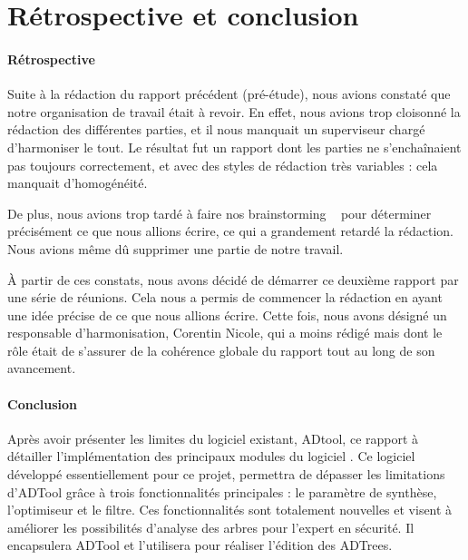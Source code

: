 \section{Rétrospective et conclusion}
	\paragraph{Rétrospective} Suite à la rédaction du rapport précédent (pré-étude), nous avions constaté que notre organisation de travail était à revoir. En effet, nous avions trop cloisonné la rédaction des différentes parties, et il nous manquait un superviseur chargé d'harmoniser le tout. Le résultat fut un rapport dont les parties ne s'enchaînaient pas toujours correctement, et avec des styles de rédaction très variables : cela manquait d'homogénéité.

	De plus, nous avions trop tardé à faire nos \og brainstorming \fg~ pour déterminer précisément ce que nous allions écrire, ce qui a grandement retardé la rédaction. Nous avions même dû supprimer une partie de notre travail.

	À partir de ces constats, nous avons décidé de démarrer ce deuxième rapport par une série de réunions. Cela nous a permis de commencer la rédaction en ayant une idée précise de ce que nous allions écrire. Cette fois, nous avons désigné un responsable d'harmonisation, Corentin {\sc Nicole}, qui a moins rédigé mais dont le rôle était de s'assurer de la cohérence globale du rapport tout au long de son avancement.

	\paragraph{Conclusion} Après avoir présenter les limites du logiciel existant, ADtool, ce rapport à détailler l'implémentation des principaux modules du logiciel \glasir{}. Ce logiciel développé essentiellement pour ce projet, permettra de dépasser les limitations d'ADTool grâce à trois fonctionnalités principales : le paramètre de synthèse, l'optimiseur et le filtre. Ces fonctionnalités sont totalement nouvelles et visent à améliorer les possibilités d'analyse des arbres pour l'expert en sécurité. Il encapsulera ADTool et l'utilisera pour réaliser l'édition des ADTrees. 


